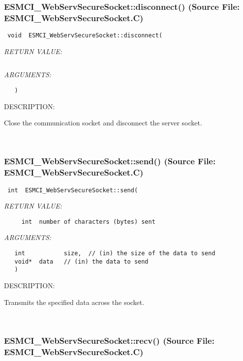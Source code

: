 \subsubsection{ESMCI\_WebServSecureSocket::disconnect() (Source File: ESMCI\_WebServSecureSocket.C)}


  
\begin{verbatim} void  ESMCI_WebServSecureSocket::disconnect(\end{verbatim}{\em RETURN VALUE:}
\begin{verbatim} \end{verbatim}{\em ARGUMENTS:}
\begin{verbatim}   )\end{verbatim}
{\sf DESCRIPTION:\\ }


      Close the communication socket and disconnect the server socket.
   
 
\mbox{}\hrulefill\
 
\subsubsection{ESMCI\_WebServSecureSocket::send() (Source File: ESMCI\_WebServSecureSocket.C)}


  
\begin{verbatim} int  ESMCI_WebServSecureSocket::send(\end{verbatim}{\em RETURN VALUE:}
\begin{verbatim}     int  number of characters (bytes) sent\end{verbatim}{\em ARGUMENTS:}
\begin{verbatim}   int           size,  // (in) the size of the data to send
   void*  data   // (in) the data to send
   )\end{verbatim}
{\sf DESCRIPTION:\\ }


      Transmits the specified data across the socket.
   
 
\mbox{}\hrulefill\
 
\subsubsection{ESMCI\_WebServSecureSocket::recv() (Source File: ESMCI\_WebServSecureSocket.C)}


